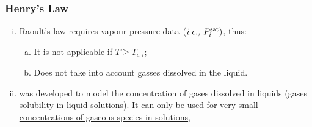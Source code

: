 \documentclass[10pt,compress,unknownkeysallowed]{beamer}
\begin{document}
\begin{frame}
  \frametitle{Henry's Law}
  \begin{enumerate}[i)]
      \item<1-> Raoult's law requires vapour pressure data $\left(\text{{\it i.e., }} P_{i}^{\text{sat}}\right)$, thus:
        \begin{enumerate}[a)]
            \item<1-> It is not applicable if $T\geq T_{c,i}$;
            \item<1-> Does not take into account gasses dissolved in the liquid.
        \end{enumerate}
      \item<2->  was developed to model the concentration of gases dissolved in liquids (\ie gases solubility in liquid solutions). It can only be used for \underline{very small concentrations of gaseous species in solutions}, 
  \end{enumerate}
\end{frame}
\end{document}
